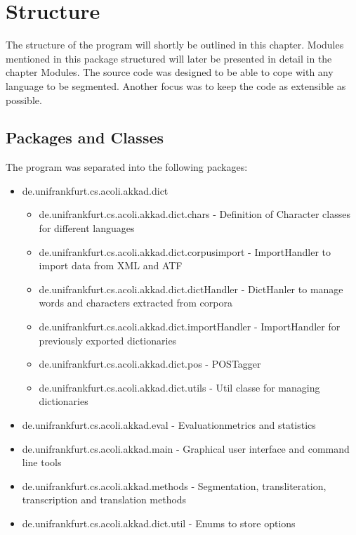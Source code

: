 \documentclass[10pt,a4paper,titlepage]{report}
\begin{document}
	\chapter{Structure}
	The structure of the program will shortly be outlined in this chapter. Modules mentioned in this package structured will later be presented in detail in the chapter Modules.
	The source code was designed to be able to cope with any language to be segmented. Another focus was to keep the code as extensible as possible.
	\section{Packages and Classes}
	The program was separated into the following packages:
	\begin{itemize}
		\item de.unifrankfurt.cs.acoli.akkad.dict
		\begin{itemize}
			\item de.unifrankfurt.cs.acoli.akkad.dict.chars - Definition of Character classes for different languages
			\item de.unifrankfurt.cs.acoli.akkad.dict.corpusimport - ImportHandler to import data from XML and ATF
			\item de.unifrankfurt.cs.acoli.akkad.dict.dictHandler - DictHanler to manage words and characters extracted from corpora
			\item de.unifrankfurt.cs.acoli.akkad.dict.importHandler - ImportHandler for previously exported dictionaries
			\item de.unifrankfurt.cs.acoli.akkad.dict.pos - POSTagger
			\item de.unifrankfurt.cs.acoli.akkad.dict.utils - Util classe for managing dictionaries
		\end{itemize}
		\item de.unifrankfurt.cs.acoli.akkad.eval - Evaluationmetrics and statistics
		\item de.unifrankfurt.cs.acoli.akkad.main - Graphical user interface and command line tools
		\item de.unifrankfurt.cs.acoli.akkad.methods - Segmentation, transliteration, transcription and translation methods
		\item de.unifrankfurt.cs.acoli.akkad.dict.util - Enums to store options
	\end{itemize}
\end{document}
